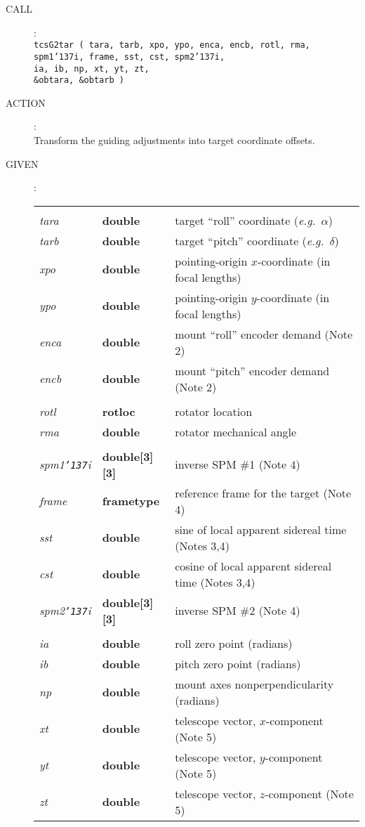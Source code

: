 \documentclass[12pt,fleqn,twoside]{article}
\renewcommand{\_}{{\tt\char'137}}     %
\newcommand{\call}[1]
{
  \goodbreak
  \begin{description}
    \item[CALL]: \\[0.5ex] \nopagebreak
        {\tt #1}
  \end{description}
  \vspace{-3ex}
}
\newcommand{\action}[1]
{
  \goodbreak
  \begin{description}
    \item[ACTION]: \\[0.5ex] \nopagebreak
        #1
  \end{description}
  \vspace{-3ex}
}
\newcommand{\args}[2]
{
  \goodbreak
  \begin{description}
  \item[#1]: \\[1.5ex] \nopagebreak
    \hspace*{-0.9em}
    \begin{tabular}{p{4.5em}p{5.8em}p{23.5em}}
      #2
    \end{tabular}
  \end{description}
  \vspace{-3ex}
}
\newcommand{\specsubhead}[1]
{
  \multicolumn{3}{l}{\hspace*{-2em}{\sc #1~:}}
}
\newcommand{\spec}[3]
{
  {\em {#1}} & {\bf \mbox{#2}} & {#3}
}
\begin{document}
\call{tcsG2tar ( tara, tarb, xpo, ypo, enca, encb, rotl, rma, \\
   \hspace*{5em} spm1\_i, frame, sst, cst, spm2\_i, \\
   \hspace*{5em} ia, ib, np, xt, yt, zt, \\
   \hspace*{5.1em} \&obtara, \&obtarb ) }
\action{Transform the guiding adjustments into target coordinate offsets.}
\args{GIVEN}
{
\specsubhead{State before absorb operation} \\
\spec{tara}{double}{target ``roll'' coordinate ({\it e.g.}~$\alpha$)} \\
\spec{tarb}{double}{target ``pitch'' coordinate ({\it e.g.}~$\delta$)} \\
\spec{xpo}{double}{pointing-origin $x$-coordinate (in focal lengths)} \\
\spec{ypo}{double}{pointing-origin $y$-coordinate (in focal lengths)} \\
\spec{enca}{double}{mount ``roll'' encoder demand (Note 2)} \\
\spec{encb}{double}{mount ``pitch'' encoder demand (Note 2)} \\
\specsubhead{Rotator} \\
\spec{rotl}{\sc rotloc}{rotator location} \\
\spec{rma}{double}{rotator mechanical angle} \\
\specsubhead{Celestial transformation} \\
\spec{spm1\_i}{double[3][3]}{inverse SPM \#1 (Note 4)} \\
\spec{frame}{\sc frametype}{reference frame for the target (Note 4)} \\
\spec{sst}{double}{sine of local apparent sidereal time (Notes 3,4)  } \\
\spec{cst}{double}{cosine of local apparent sidereal time (Notes 3,4)} \\
\spec{spm2\_i}{double[3][3]}{inverse SPM \#2 (Note 4)} \\
\specsubhead{Pointing model} \\
\spec{ia}{double}{roll zero point (radians)} \\
\spec{ib}{double}{pitch zero point (radians)} \\
\spec{np}{double}{mount axes nonperpendicularity (radians)} \\
\spec{xt}{double}{telescope vector, $x$-component (Note 5)} \\
\spec{yt}{double}{telescope vector, $y$-component (Note 5)} \\
\spec{zt}{double}{telescope vector, $z$-component (Note 5)}
}
\end{document}
